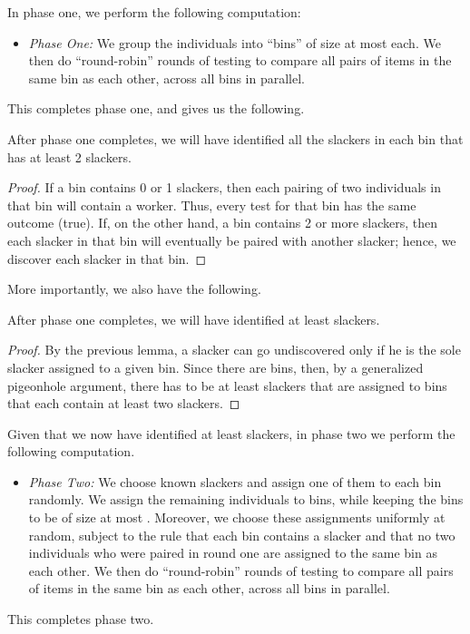 \documentclass[11pt]{llncs}
\begin{document}
In phase one, we perform the following computation:
\begin{itemize}
\item
\emph{Phase One:}
We group the individuals into  ``bins'' of size 
at most  each.
We then do  
``round-robin'' rounds of testing to compare all pairs of
items in the same bin as each other, across all bins in parallel. 
\end{itemize}
This completes phase one, and gives us the following.

\begin{lemma}
\label{lem:two-slackers}
After phase one completes, we will have
identified all the slackers in each bin that has at least 2 slackers.
\end{lemma}
\begin{proof}
If a bin contains 0 or 1 slackers, then each pairing of two individuals in that bin will contain a worker. Thus, every test for that 
bin has the same outcome (true).
If, on the other hand, a bin contains 2 or more slackers, then each slacker 
in that bin
will eventually be paired with another slacker; hence, we discover each
slacker in that bin.
\end{proof}

More importantly, we also have the following.

\begin{lemma}
After phase one completes, we will have
identified at least 
slackers.
\end{lemma}
\begin{proof}
By the previous lemma, a slacker can go undiscovered only if he is the sole
slacker assigned to a given bin.
Since there are  bins, then,
by a generalized pigeonhole argument, there has to be 
at least 
slackers that are assigned to bins that each contain at least two slackers.
\end{proof}

Given that we now have identified at least 
slackers, in phase two we perform the following computation.
\begin{itemize}
\item
\emph{Phase Two:}
We choose  known slackers and assign one of them to each bin randomly.
We assign the remaining individuals to bins, while keeping the bins to be of size
at most .
Moreover, we choose these assignments uniformly at random, 
subject to the rule that each
bin contains a slacker and that no two individuals who were paired in round one are assigned to the same bin as each other.
We then do  
``round-robin'' rounds of testing to compare all pairs of
items in the same bin as each other, across all bins in parallel. 
\end{itemize}
This completes phase two. 
\end{document}
